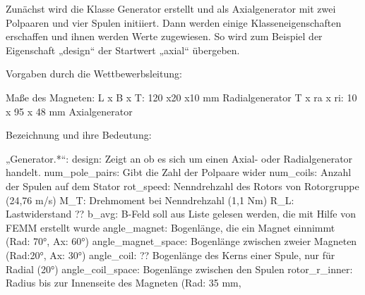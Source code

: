

Zunächst wird die Klasse Generator erstellt und als Axialgenerator mit zwei Polpaaren und vier Spulen initiiert. Dann werden einige Klasseneigenschaften erschaffen und ihnen werden Werte zugewiesen. So wird zum Beispiel der Eigenschaft „design“ der Startwert „axial“ übergeben. 



Vorgaben durch die Wettbewerbsleitung:

Maße des Magneten: 	L x B x T: 120 x20 x10 mm Radialgenerator
				T x ra x ri: 10 x 95 x 48 mm Axialgenerator

Bezeichnung und ihre Bedeutung:

„Generator.*“:
design: 		      Zeigt an ob es sich um einen Axial- oder Radialgenerator handelt.
num_pole_pairs: 	Gibt die Zahl der Polpaare wider
num_coils: 		    Anzahl der Spulen auf dem Stator
rot_speed:		    Nenndrehzahl des Rotors von Rotorgruppe (24,76 m/s)
M_T:			        Drehmoment bei Nenndrehzahl (1,1 Nm)
R_L:			        Lastwiderstand 					??
b_avg:		        B-Feld soll aus Liste gelesen werden, die mit Hilfe von FEMM erstellt 			wurde
angle_magnet:		    Bogenlänge, die ein Magnet einnimmt (Rad: 70°, Ax: 60°)
angle_magnet_space:	Bogenlänge zwischen zweier Magneten (Rad:20°, Ax: 30°)
angle_coil:			    ?? Bogenlänge des Kerns einer Spule, nur für Radial (20°)
angle_coil_space:		Bogenlänge zwischen den Spulen
rotor_r_inner:	  Radius bis zur Innenseite des Magneten (Rad: 35 mm, 
